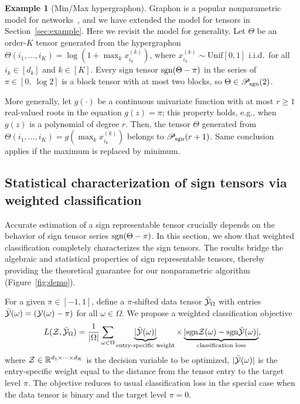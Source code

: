 \documentclass{article}
\theoremstyle{plain}
\theoremstyle{definition}
\newtheorem{example}{Example}
\newcommand*{\KeepStyleUnderBrace}[1]{%
  \mathop{%
    \mathchoice
    {\underbrace{\displaystyle#1}}%
    {\underbrace{\textstyle#1}}%
    {\underbrace{\scriptstyle#1}}%
    {\underbrace{\scriptscriptstyle#1}}%
  }\limits
}
\def\sign{\textup{sgn}}
\def\caliP{\mathscr{P}_{\textup{sgn}}}
\begin{document}
\begin{example}[Min/Max hypergraphon] Graphon is a popular nonparametric model for networks~\cite{chan2014consistent,xu2018rates}, and we have extended the model for tensors in Section~\ref{sec:example}. Here we revisit the model for generality. Let $\Theta$ be an order-$K$ tensor generated from the hypergraphon $\Theta(i_1,\ldots,i_K)=\log(1+\max_kx^{(k)}_{i_k})$, where $x^{(k)}_{i_k}\sim \text{Unif}[0,1]$ i.i.d.\ for all $i_k\in[d_k]$ and $k\in[K]$. Every sign tensor $\sign(\Theta-\pi)$ in the series of $\pi\in[0,\ \log 2]$ is a block tensor with at most two blocks, so $\Theta \in \caliP(2)$. 

More generally, let $g(\cdot)$ be a continuous univariate function with at most $r\geq 1$ real-valued roots in the equation $g(z)=\pi$; this property holds, e.g., when $g(z)$ is a polynomial of degree $r$. Then, the tensor $\Theta$ generated from $\Theta(i_1,\ldots,i_K)=g(\max_kx^{(k)}_{i_k})$ belongs to $\caliP(r+1)$. Same conclusion applies if the maximum is replaced by minimum.
\end{example}

\subsection{Statistical characterization of sign tensors via weighted classification}

Accurate estimation of a sign representable tensor crucially depends on the behavior of sign tensor series $\sign(\Theta-\pi)$. In this section, we show that weighted classification completely characterizes the sign tensors. The results bridge the algebraic and statistical properties of sign representable tensors, thereby providing the theoretical guarantee for our nonparametric algorithm (Figure~\ref{fig:demo}).
 
For a given $\pi \in [-1,1]$, define a $\pi$-shifted data tensor $\bar {\mathcal{Y}}_\Omega$ with entries $\bar {\mathcal{Y}}(\omega) = (\mathcal{Y}(\omega)-\pi)$ for all $\omega\in \Omega$. We propose a weighted classification objective
\begin{equation}\label{eq:sample}
L(\tZ, \bar \tY_\Omega)= {1\over |\Omega|}\sum_{\omega \in \Omega}\KeepStyleUnderBrace{|\bar \tY(\omega)|}_{\text{entry-specific weight}} \times \KeepStyleUnderBrace{| \sign \tZ(\omega)-\sign \bar \tY(\omega)|}_{\text{classification loss}},
\end{equation}
where $\mathcal{Z}\in\mathbb{R}^{d_1\times \cdots \times d_K}$ is the decision variable to be optimized, $|\bar {\mathcal{Y}}(\omega)|$ is the entry-specific weight equal to the distance from the tensor entry to the target level $\pi$. The objective reduces to usual classification loss in the special case when the data tensor is binary and the target level $\pi=0$.
\end{document}
